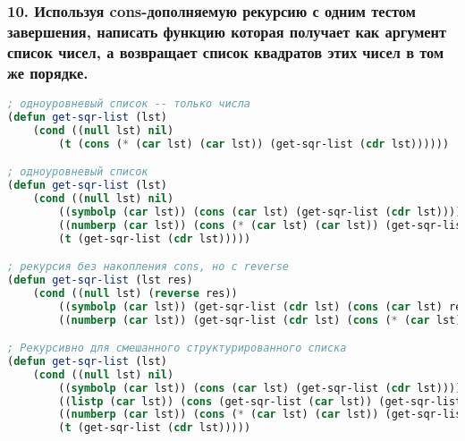 \subsubsection*{10. Используя cons-дополняемую рекурсию с одним тестом завершения,	написать функцию которая получает как аргумент список чисел, а возвращает список	квадратов этих чисел в том же порядке.}
\begin{lstlisting}[language=Lisp]
; одноуровневый список -- только числа
(defun get-sqr-list (lst)
	(cond ((null lst) nil)
		(t (cons (* (car lst) (car lst)) (get-sqr-list (cdr lst))))))

; одноуровневый список
(defun get-sqr-list (lst)
	(cond ((null lst) nil)
		((symbolp (car lst)) (cons (car lst) (get-sqr-list (cdr lst))))
		((numberp (car lst)) (cons (* (car lst) (car lst)) (get-sqr-list (cdr lst))))
		(t (get-sqr-list (cdr lst)))))

; рекурсия без накопления cons, но с reverse
(defun get-sqr-list (lst res)
	(cond ((null lst) (reverse res))
		((symbolp (car lst)) (get-sqr-list (cdr lst) (cons (car lst) res)))
		((numberp (car lst)) (get-sqr-list (cdr lst) (cons (* (car lst) (car lst)) res)))))

; Рекурсивно для смешанного структурированного списка
(defun get-sqr-list (lst)
	(cond ((null lst) nil)
		((symbolp (car lst)) (cons (car lst) (get-sqr-list (cdr lst))))
		((listp (car lst)) (cons (get-sqr-list (car lst)) (get-sqr-list (cdr lst))))
		((numberp (car lst)) (cons (* (car lst) (car lst)) (get-sqr-list (cdr lst))))
		(t (get-sqr-list (cdr lst)))))
\end{lstlisting}
